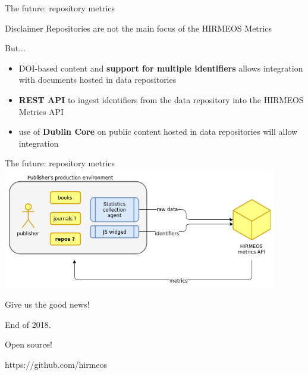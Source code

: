 \documentclass[xcolor=svgnames]{beamer}
\begin{document}
        \begin{frame}{The future: repository metrics}
            \begin{block}{Disclaimer}
                Repositories are not the main focus of the HIRMEOS Metrics
            \end{block}

            \pause

            \begin{center}
                But...
            \end{center}

            \pause

            \begin{itemize}
                \item DOI-based content and \textbf{support for multiple identifiers} allows integration with documents hosted in data repositories
                \pause
                \item \textbf{REST API} to ingest identifiers from the data repository into the HIRMEOS Metrics API
                \pause
                \item use of \textbf{Dublin Core} on public content hosted in data repositories will allow integration
            \end{itemize}
        \end{frame}

        \begin{frame}{The future: repository metrics}
            \includegraphics[width=0.9\textwidth]{img/wp6_for_repositories}
        \end{frame}

        \begin{frame}{Give us the good news!}
            \pause
            \begin{center}
                \Huge{End of 2018.}
            \end{center}
            \pause
            \vspace{0.05\textheight}
            \begin{center}
                \Huge{Open source!}
            \end{center}
            \pause
            \vspace{0.05\textheight}
            \begin{center}
                \Huge{https://github.com/hirmeos}
            \end{center}
        \end{frame}
\end{document}
